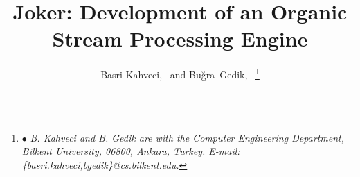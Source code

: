 



\title{Joker: Development of an Organic Stream Processing Engine}

\author{Basri Kahveci,~ and Bu\u{g}ra~Gedik,~%
\thanks{$\bullet$ \emph{B. Kahveci and B. Gedik are with the Computer Engineering Department, 
                        Bilkent University, 06800, Ankara, Turkey. E-mail: \{basri.kahveci,bgedik\}@cs.bilkent.edu. }}}

\IEEEcompsoctitleabstractindextext{}
\maketitle











 



